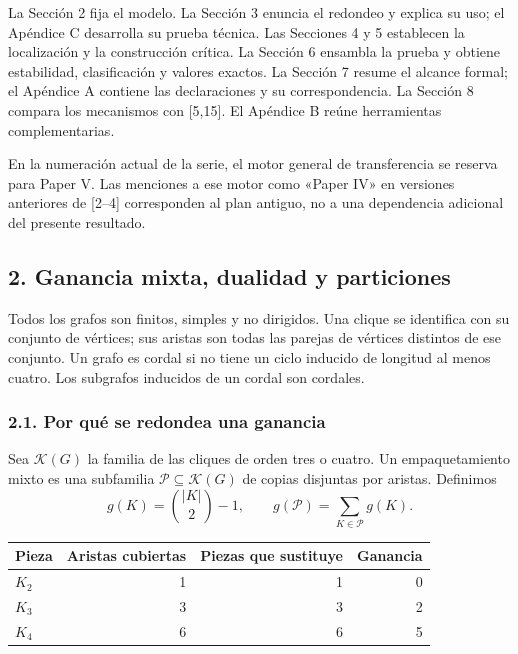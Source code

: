 \documentclass[spanish,11pt,a4paper]{article}
\newcounter{none}
\begin{document}
La Sección 2 fija el modelo. La Sección 3 enuncia el redondeo y explica su uso; el Apéndice C desarrolla su prueba técnica. Las Secciones 4 y 5 establecen la localización y la construcción crítica. La Sección 6 ensambla la prueba y obtiene estabilidad, clasificación y valores exactos. La Sección 7 resume el alcance formal; el Apéndice A contiene las declaraciones y su correspondencia. La Sección 8 compara los mecanismos con {[}5,15{]}. El Apéndice B reúne herramientas complementarias.

En la numeración actual de la serie, el motor general de transferencia se reserva para Paper V. Las menciones a ese motor como «Paper IV» en versiones anteriores de {[}2--4{]} corresponden al plan antiguo, no a una dependencia adicional del presente resultado.

\subsection{2. Ganancia mixta, dualidad y particiones}\label{ganancia-mixta-dualidad-y-particiones}

Todos los grafos son finitos, simples y no dirigidos. Una clique se identifica con su conjunto de vértices; sus aristas son todas las parejas de vértices distintos de ese conjunto. Un grafo es cordal si no tiene un ciclo inducido de longitud al menos cuatro. Los subgrafos inducidos de un cordal son cordales.

\subsubsection{2.1. Por qué se redondea una ganancia}\label{por-quuxe9-se-redondea-una-ganancia}

Sea \(\mathcal K(G)\) la familia de las cliques de orden tres o cuatro. Un empaquetamiento mixto es una subfamilia \(\mathcal P\subseteq\mathcal K(G)\) de copias disjuntas por aristas. Definimos \[
g(K)=\binom{|K|}{2}-1,\qquad
g(\mathcal P)=\sum_{K\in\mathcal P}g(K).
\]


{\def\LTcaptype{none} %
\begin{longtable}[c]{@{}lrrr@{}}
\toprule\noalign{}
Pieza & Aristas cubiertas & Piezas que sustituye & Ganancia \\
\midrule\noalign{}
\endhead
\bottomrule\noalign{}
\endlastfoot
\(K_2\) & 1 & 1 & 0 \\
\(K_3\) & 3 & 3 & 2 \\
\(K_4\) & 6 & 6 & 5 \\
\end{longtable}
}
\end{document}
